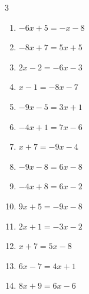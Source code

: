 \begin{multicols}{3}
\begin{enumerate}

  \item $-6x+5=-x-8$


  \item $-8x+7=5x+5$


  \item $2x-2=-6x-3$


  \item $x-1=-8x-7$


  \item $-9x-5=3x+1$


  \item $-4x+1=7x-6$


  \item $x+7=-9x-4$


  \item $-9x-8=6x-8$

        \phantom{$\displaystyle x=0$}

  \item $-4x+8=6x-2$

        \phantom{$\displaystyle x=1$}

  \item $9x+5=-9x-8$


  \item $2x+1=-3x-2$


  \item $x+7=5x-8$


  \item $6x-7=4x+1$

        \phantom{$\displaystyle x=4$}

  \item $8x+9=6x-6$


\end{enumerate}
\end{multicols}
